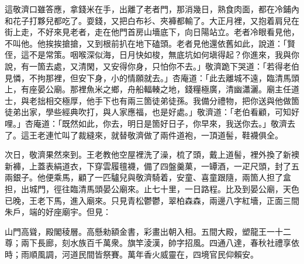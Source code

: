 這敬濟口雖答應，拿錢米在手，出離了老者門，那消幾日，熟食肉面，都在冷鋪內和花子打夥兒都吃了。耍錢，又把白布衫、夾褲都輸了。大正月裡，又抱着肩兒在街上走，不好來見老者，走在他門首房山墻底下，向日陽站立。老者冷眼看見他，不叫他。他挨挨搶搶，又到根前扒在地下磕頭。{}老者見他還依舊如此，說道：「賢侄，這不是常策。咽喉深似海，日月快如梭，無底坑如何塡得起？你進來，我與你說，有一箇去處，又清閑，又安得你身，只怕你不去。」敬濟跪下哭道：「若得老伯見憐，不拘那裡，但安下身，小的情願就去。」杏庵道：「此去離城不遠，臨清馬頭上，有座晏公廟。那裡魚米之鄉，舟船輻輳之地，錢糧極廣，清幽瀟灑。廟主任道士，與老拙相交極厚，他手下也有兩三箇徒弟徒孫。我備分禮物，把你送與他做箇徒弟出家，學些經典吹打，與人家應福，也是好處。」敬濟道：「老伯看顧，可知好哩。」杏庵道：「既然如此，你去，明日是箇好日子，你早來，我送你去。」敬濟去了。這王老連忙叫了裁縫來，就替敬濟做了兩件道袍，一頂道髻，鞋襪俱全。

次日，敬濟果然來到。王老教他空屋裡洗了澡，梳了頭，戴上道髻，裡外換了新襖新褲，上蓋表絹道衣，下穿雲履氊襪，備了四盤羹菓，一罈酒，一疋尺頭，封了五兩銀子。他便乘馬，顧了一匹驢兒與敬濟騎着，安童、喜童跟隨，兩箇人担了盒担，出城門，徑往臨清馬頭晏公廟來。止七十里，一日路程。比及到晏公廟，天色已晚，王老下馬，進入廟來。只見青松鬱鬱，翠柏森森，兩邊八字紅墻，正面三間朱戶，端的好座廟宇。但見：

\begin{myquote}
山門高聳，殿閣稜層。高懸勑額金書，彩畫出朝入相。{}五間大殿，塑龍王一十二尊；兩下長廊，刻水族百千萬衆。旗竿淩漢，帥字招風。四通八達，春秋社禮享依時；雨順風調，河道民間皆祭賽。萬年香火威靈在，四境官民仰賴安。
\end{myquote}

